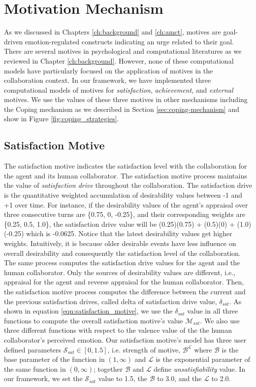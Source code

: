 \documentclass[12pt]{report}
\begin{document}
\section{Motivation Mechanism}
\label{sec:motivation_mechanism}
As we discussed in Chapters \ref{ch:background} and \ref{ch:amct}, motives are
goal-driven emotion-regulated constructs indicating an urge related to their
goal. There are several motives in psychological and computational literatures
as we reviewed in Chapter \ref{ch:background}. However, none of these
computational models have particularly focused on the application of motives in
the collaboration context. In our framework, we have implemented three
computational models of motives for \textit{satisfaction}, \textit{achievement},
and \textit{external} motives. We use the values of these three motives in other
mechanisms including the Coping mechanism as we described in Section
\ref{sec:coping-mechanism} and show in Figure \ref{fig:coping_strategies}.

\subsection{Satisfaction Motive}
The satisfaction motive indicates the satisfaction level with the collaboration
for the agent and its human collaborator. The satisfaction motive process maintains
the value of \textit{satisfaction drive} throughout the collaboration. The
satisfaction drive is the quantitative weighted accumulation of desirability
values between -1 and +1 over time. For instance, if the desirability values of
the agent's appraisal over three consecutive turns are \{0.75, 0, -0.25\}, and
their corresponding weights are \{0.25, 0.5, 1.0\}, the satisfaction drive value
will be (0.25)(0.75) + (0.5)(0) + (1.0)(-0.25) which is -0.0625. Notice that
the latest desirability values get higher weights. Intuitively, it is because
older desirable events have less influence on overall desirability and
consequently the satisfaction level of the collaboration. The same process
computes the satisfaction drive values for the agent and the human collaborator.
Only the sources of desirability values are different, i.e., appraisal for the
agent and reverse appraisal for the human collaborator. Then, the satisfaction
motive process computes the difference between the current and the previous
satisfaction drives, called delta of satisfaction drive value, $\delta_{sat}$.
As shown in equation \ref{eqn:satisfaction_motive}, we use the $\delta_{sat}$
value in all three functions to compute the overall satisfaction motive's value
$\mathcal{M}_{sat}$. We also use three different functions with respect to the
valence value of the the human collaborator's perceived emotion. Our
satisfaction motive's model has three user defined parameters $\mathcal{S}_{sat}
\in [0, 1.5]$, i.e. strength of motive, $\mathcal{B}^\mathcal{L}$ where
$\mathcal{B}$ is the base parameter of the function in $(1,\infty)$ and
$\mathcal{L}$ is the exponential parameter of the same function in $(0,
\infty)$; together $\mathcal{B}$ and $\mathcal{L}$ define
\textit{unsatisfiability} value. In our framework, we set the
$\mathcal{S}_{sat}$ value to 1.5, the $\mathcal{B}$ to 3.0, and the
$\mathcal{L}$ to 2.0.
\end{document}
